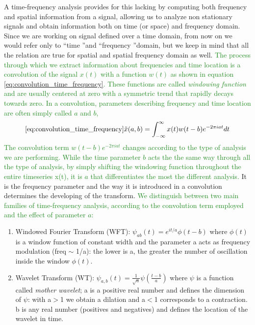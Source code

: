 \documentclass[11pt]{report}
\begin{document}
A time-frequency analysis provides for this lacking by computing both frequency and spatial information from a signal, allowing us to analyze non stationary signals and obtain information both on time (or space) and frequency domain.
Since we are working on signal defined over a time domain, from now on we would refer only to  \textquotedblleft time \textquotedblright  and  \textquotedblleft frequency \textquotedblright domain, but we keep in mind that all the relation are true for spatial and spatial frequency domain as well.
\textcolor{ForestGreen}{
The process through which we extract information about frequencies and time location is a convolution of the signal $x(t)$ with a function $w(t)$ as shown in equation \ref{eq:convolution_time_frequency}.
These functions are called \emph{windowing function} and are usually centered at zero with a symmetric trend that rapidly decays towards zero.
In a convolution, parameters describing frequency and time location are often simply called $a$ and $b$,
\begin{equation}\ref{eq:convolution_time_frequency}
\tilde{x}(a, b) = \int_{-\infty}^{\infty} x(t)w(t-b) e^{-2\pi i a t} dt
\end{equation}
The convolution term $w(t-b) e^{-2\pi i a t}$ changes according to the type of analysis we are performing.
While the time parameter $b$ acts the the same way through all the type of analysis, by simply shifting the windowing function throughout the entire timeseries x(t), it is $a$ that differentiates the most the different analysis.
}
It is the frequency parameter and the way it is introduced in a convolution determines the developing of the transform.
\textcolor{ForestGreen}{
We distinguish between two main families of time-frequency analysis, according to the convolution term employed and the effect of parameter $a$:
}
\begin{enumerate}
\item Windowed Fourier Transform (WFT): $\psi_{ab}(t) = e^{it/a}\phi(t-b)$ where $\phi(t)$ is a window function of constant width and the parameter a acts as frequency modulation (freq $\sim$ 1/a): the lower is a, the greater the number of oscillation inside the window $\phi(t)$.
\item Wavelet Transform (WT): $\psi_{a, b}(t) = \frac{1}{\sqrt{a}}\psi(\frac{t-b}{a})$ where $\psi$ is a function called \emph{mother wavelet}; a is a positive real number and defines the dimension of $\psi$: with a$>$1 we obtain a dilation and a$<$1 corresponds to a contraction. b is any real number (positives and negatives) and defines the location of the wavelet in time.
\end{enumerate}
\end{document}
